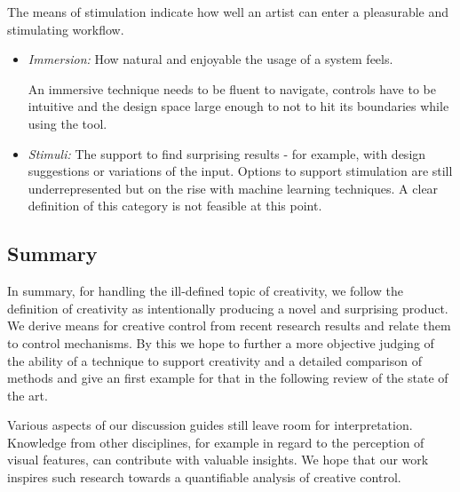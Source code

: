 The means of stimulation indicate how well an artist can enter a pleasurable and stimulating workflow.
\begin{itemize}
    \item \textit{Immersion:} How natural and enjoyable the usage of a system feels.

    An immersive technique needs to be fluent to navigate, controls have to be intuitive and the design space large enough to not to hit its boundaries while using the tool. 
    

    \item \textit{Stimuli:} The support to find surprising results - for example, with design suggestions or variations of the input. Options to support stimulation are still underrepresented but on the rise with machine learning techniques. A clear definition of this category is not feasible at this point.

\end{itemize}


\subsection{Summary}
\label{subsec:creativity_summary}

In summary, for handling the ill-defined topic of creativity, we follow the definition of creativity as intentionally producing a novel and surprising product. We derive means for creative control from recent research results and relate them to control mechanisms. By this we hope to further a more objective judging of the ability of a technique to support creativity and a detailed comparison of methods and give an first example for that in the following review of the state of the art.

Various aspects of our discussion guides still leave room for interpretation. Knowledge from other disciplines, for example in regard to the perception of visual features, can contribute with valuable insights. We hope that our work inspires such research towards a quantifiable analysis of creative control.

